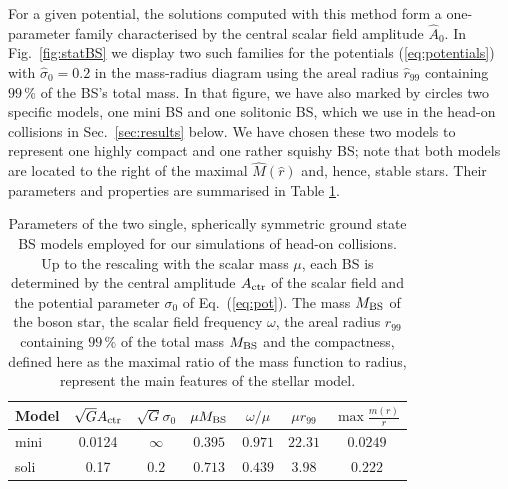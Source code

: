 \documentclass[]{iopart}
\begin{document}
For a given potential, the solutions computed with this method form
a one-parameter family characterised by the central scalar field
amplitude $\hat{A}_0$. In Fig.~\ref{fig:statBS} we display two such
families for the potentials (\ref{eq:potentials}) with $\hat{\sigma}_0=0.2$
in the mass-radius diagram using the areal radius $\hat{r}_{99}$
containing $99\,\%$ of the BS's total mass. In that figure, we have
also marked by circles two specific models, one mini BS and one
solitonic BS, which we use in the head-on collisions in
Sec.~\ref{sec:results} below.  We have chosen these two models to
represent one highly compact and one rather squishy BS; note that
both models are located to the right of the maximal $\hat{M}(\hat{r})$
and, hence, stable stars.  Their parameters and properties are
summarised in Table \ref{tab:models}.
%
\begin{table}
    \centering
    \begin{tabular}{l|cccccc}
    \hline
    Model & $\sqrt{G}A_{\rm ctr}$ & $\sqrt{G}\sigma_0$ & $\mu M_{\rm BS}$ & $\omega/\mu$ & $\mu r_{99}$ & $\max\frac{m(r)}{r}$  \\
    \hline
    mini & 0.0124 & $\infty$ & $0.395$ & $0.971$ & $22.31$ & $0.0249$ \\
    soli & 0.17 & $0.2$ & $0.713$ & $0.439$ & $3.98$ & $0.222$ \\
    \hline
    \end{tabular}
    \caption{Parameters of the two single, spherically symmetric
    ground state BS models employed for our simulations of head-on
    collisions. Up to the rescaling with the scalar mass $\mu$,
    each BS is determined by the central amplitude $A_{\rm ctr}$
    of the scalar field and the potential parameter $\sigma_0$ of
    Eq.~(\ref{eq:pot}). The mass $M_{\rm BS}$ of the boson star,
    the scalar field frequency $\omega$, the areal radius $r_{99}$
    containing $99\,\%$ of the total mass $M_{\rm BS}$ and the
    compactness, defined here as the maximal ratio of the mass
    function to radius, represent the main features of the stellar
    model.}
    \label{tab:models}
\end{table}
%
\end{document}
